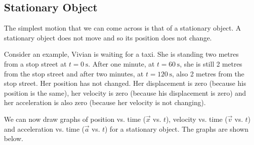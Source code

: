             \subsection*{Stationary Object}
            \nopagebreak
        \label{m38795*id69015}The simplest motion that we can come across is that of a stationary object. A stationary object does not move and so its position does not change.

\begin{minipage}{.5\textwidth}
        \label{m38795*id69021}Consider an example, Vivian is waiting for a taxi. She is standing two metres from a stop street at $t=0~\text{s}$. After one minute, at $t=60~\text{s}$, she is still 2 metres from the stop street and after two minutes, at $t=120~\text{s}$, also 2 metres from the stop street. Her position has not changed. Her displacement is zero (because his position is the same), her velocity is zero (because his displacement is zero) and her acceleration is also zero (because her velocity is not changing).

        \label{m38795*id69081}We can now draw graphs of position vs. time ($\vec{x}$ vs. $t$), velocity vs. time ($\vec{v}$ vs. $t$) and acceleration vs. time ($\vec{a}$ vs. $t$) for a stationary object. The graphs are shown below.
\end{minipage}
